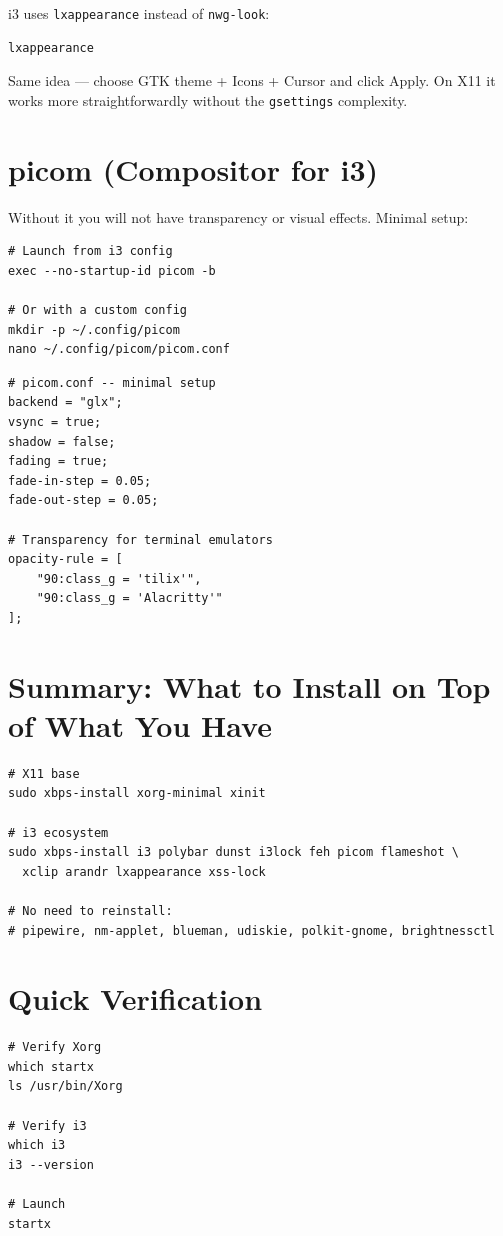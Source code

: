 \documentclass[12pt, a4paper]{book}
\begin{document}
i3 uses \texttt{lxappearance} instead of \texttt{nwg-look}:

\begin{lstlisting}
lxappearance
\end{lstlisting}

Same idea --- choose GTK theme + Icons + Cursor and click Apply. On X11 it works more straightforwardly without the \texttt{gsettings} complexity.

\section{picom (Compositor for i3)}

Without it you will not have transparency or visual effects. Minimal setup:

\begin{lstlisting}
# Launch from i3 config
exec --no-startup-id picom -b

# Or with a custom config
mkdir -p ~/.config/picom
nano ~/.config/picom/picom.conf
\end{lstlisting}

\begin{lstlisting}
# picom.conf -- minimal setup
backend = "glx";
vsync = true;
shadow = false;
fading = true;
fade-in-step = 0.05;
fade-out-step = 0.05;

# Transparency for terminal emulators
opacity-rule = [
    "90:class_g = 'tilix'",
    "90:class_g = 'Alacritty'"
];
\end{lstlisting}

\section{Summary: What to Install on Top of What You Have}

\begin{lstlisting}
# X11 base
sudo xbps-install xorg-minimal xinit

# i3 ecosystem
sudo xbps-install i3 polybar dunst i3lock feh picom flameshot \
  xclip arandr lxappearance xss-lock

# No need to reinstall:
# pipewire, nm-applet, blueman, udiskie, polkit-gnome, brightnessctl
\end{lstlisting}

\section{Quick Verification}

\begin{lstlisting}
# Verify Xorg
which startx
ls /usr/bin/Xorg

# Verify i3
which i3
i3 --version

# Launch
startx
\end{lstlisting}

\end{document}
